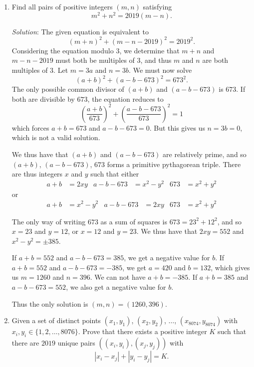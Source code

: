 \documentclass{article}
\begin{document}
\begin{enumerate}[1.]
\vfill

\item %
Find all pairs of positive integers $(m,n)$ satisfying
\[ m^2 +n^2 = 2019(m-n). \]

\textit{Solution}:
The given equation is equivalent to
\[
	(m + n)^2 + (m - n - 2019)^2 = 2019^2.
\]
Considering the equation modulo $3$, we determine that $m + n$ and $m - n - 2019$ must both be multiples of $3$, and thus $m$ and $n$ are both multiples of $3$. Let $m = 3a$ and $n = 3b$. We must now solve
\[
	(a + b)^2 + (a - b - 673)^2 = 673^2.
\]
The only possible common divisor of $(a + b)$ and $(a - b - 673)$ is $673$. If both are divisible by $673$, the equation reduces to
\[
	\left(\frac{a + b}{673}\right)^2 + \left(\frac{a - b - 673}{673}\right)^2 = 1
\]
which forces $a + b = 673$ and $a - b - 673 = 0$. But this gives us $n = 3b = 0$, which is not a valid solution.

We thus have that $(a + b)$ and $(a - b - 673)$ are relatively prime, and so $(a + b)$, $(a - b - 673)$, $673$ forms a primitive pythagorean triple. There are thus integers $x$ and $y$ such that either
\begin{align*}
	a + b & = 2xy & a - b - 673 & = x^2 - y^2 & 673 & = x^2 + y^2
\end{align*}
or
\begin{align*}
	a + b & = x^2 - y^2 & a - b - 673 & = 2xy & 673 & = x^2 + y^2
\end{align*}

The only way of writing $673$ as a sum of squares is $673 = 23^2 + 12^2$, and so $x = 23$ and $y = 12$, or $x = 12$ and $y = 23$. We thus have that $2xy = 552$ and $x^2 - y^2 = \pm 385$.

If $a + b = 552$ and $a - b - 673 = 385$, we get a negative value for $b$.
If $a + b = 552$ and $a - b - 673 = -385$, we get $a = 420$ and $b = 132$, which gives us $m = 1260$ and $n = 396$.
We can not have $a + b = -385$.
If $a + b = 385$ and $a - b - 673 = 552$, we also get a negative value for $b$.

Thus the only solution is $(m, n) = (1260, 396)$.

\item %
Given a set of distinct points $(x_1, y_1)$, $(x_2, y_2)$, $\dots$, $(x_{8074}, y_{8074})$ with $x_i, y_i \in \{1, 2, \dots, 8076\}$.
Prove that there exists a positive integer $K$ such that there are $2019$ unique pairs $( (x_i, y_i), (x_j, y_j) )$ with
\[ |x_i - x_j| + |y_i - y_j| = K. \]


\end{enumerate}
\end{document}
